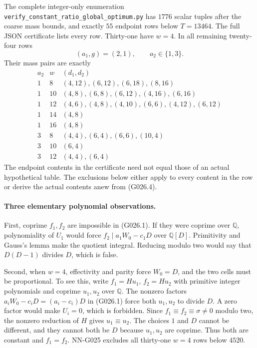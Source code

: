 The complete integer-only enumeration
\texttt{verify\_constant\_ratio\_global\_optimum.py}
has $1776$ scalar tuples after the coarse mass bounds,
and exactly $55$ endpoint rows below $T=13464$.
The full JSON certificate lists every row. Thirty-one
have $w=4$. In all remaining twenty-four rows
\[
 (a_1,g)=(2,1),\qquad a_2\in\{1,3\}.
\]
Their mass pairs are exactly
\[
\begin{array}{c|c|l}
 a_2&w&(d_1,d_2)\\\hline
 1&8&(4,12),(6,12),(6,18),(8,16)\\
 1&10&(4,8),(6,8),(6,12),(4,16),(6,16)\\
 1&12&(4,6),(4,8),(4,10),(6,6),(4,12),(6,12)\\
 1&14&(4,8)\\
 1&16&(4,8)\\
 3&8&(4,4),(6,4),(6,6),(10,4)\\
 3&10&(6,4)\\
 3&12&(4,4),(6,4)
\end{array}                                                         \tag{G026.6}
\]
The endpoint contents in the certificate need not equal
those of an actual hypothetical table. The exclusions
below either apply to every content in the row or derive
the actual contents anew from (G026.4).

\paragraph{Three elementary polynomial observations.}
First, coprime $f_1,f_2$ are impossible in (G026.1).
If they were coprime over $\mathbb Q$, polynomiality of
$U_1$ would force $f_2\mid a_1W_0-c_1D$ over $\mathbb Q[D]$.
Primitivity and Gauss's lemma make the quotient integral.
Reducing modulo two would say that $D(D-1)$ divides $D$,
which is false.

Second, when $w=4$, effectivity and parity force $W_0=D$,
and the two cells must be proportional. To see this,
write $f_1=Hu_1$, $f_2=Hu_2$ with primitive integer
polynomials and coprime $u_1,u_2$ over $\mathbb Q$.
The nonzero factors $a_iW_0-c_iD=(a_i-c_i)D$ in
(G026.1) force both $u_1,u_2$ to divide $D$.
A zero factor would make $U_i=0$, which is forbidden.
Since $f_1\equiv f_2\equiv\sigma\ne0$ modulo two,
the nonzero reduction of $H$ gives $u_1\equiv u_2$.
The choices $1$ and $D$ cannot be different, and they
cannot both be $D$ because $u_1,u_2$ are coprime.
Thus both are constant and $f_1=f_2$. NN-G025 excludes
all thirty-one $w=4$ rows below $4520$.

